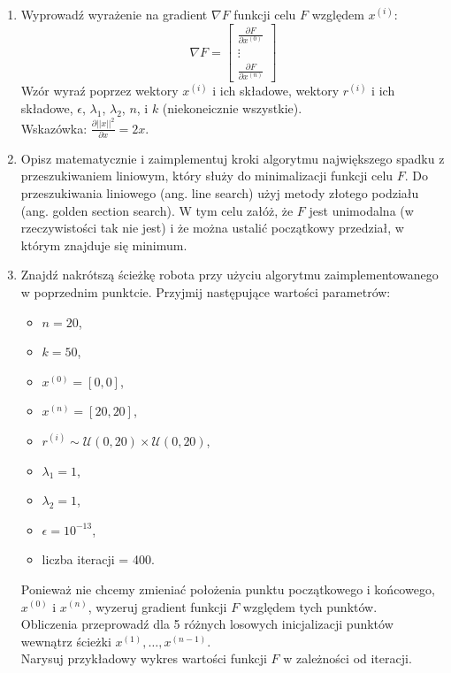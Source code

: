 \documentclass[11pt, leqno]{scrartcl}
\begin{document}
    \begin{enumerate}
        \item Wyprowadź wyrażenie na gradient $\nabla F$ funkcji
            celu $F$ względem $x^{(i)}$:
            \[
                \nabla F=
                \begin{bmatrix}
                    \frac{\partial F}{\partial x^{(0)}} \\
                    \vdots \\
                    \frac{\partial F}{\partial x^{(n)}}
                \end{bmatrix}
            \]
            Wzór wyraź poprzez wektory $x^{(i)}$ i ich składowe,
            wektory $r^{(i)}$ i ich składowe, $\epsilon$,
            $\lambda _1$, $\lambda _2$, $n$, i $k$ (niekoneicznie
            wszystkie). \\
            Wskazówka: $\frac{\partial ||x||^2}{\partial x}=2x$.
        \item Opisz matematycznie i zaimplementuj kroki algorytmu
            największego spadku z przeszukiwaniem liniowym, który
            służy do minimalizacji funkcji celu $F$. Do
            przeszukiwania liniowego (ang. line search) użyj metody
            złotego podziału (ang. golden section search). W tym
            celu załóż, że $F$ jest unimodalna (w rzeczywistości tak
            nie jest) i że można ustalić początkowy przedział,
            w którym znajduje się minimum.
        \item Znajdź nakrótszą ścieżkę robota przy użyciu algorytmu
            zaimplementowanego w poprzednim punktcie. Przyjmij
            następujące wartości parametrów:
            \begin{itemize}
                \item $n=20$,
                \item $k=50$,
                \item $x^{(0)}=[0,0]$,
                \item $x^{(n)}=[20,20]$,
                \item $r^{(i)}\sim \mathcal{U}(0,20)\times
                    \mathcal{U}(0,20)$,
                \item $\lambda _1=1$,
                \item $\lambda _2=1$,
                \item $\epsilon =10^{-13}$,
                \item liczba iteracji = 400.
            \end{itemize}
            Ponieważ nie chcemy zmieniać położenia punktu
            początkowego i końcowego, $x^{(0)}$ i $x^{(n)}$,
            wyzeruj gradient funkcji $F$ względem tych punktów. \\
            Obliczenia przeprowadź dla 5 różnych losowych
            inicjalizacji punktów wewnątrz ścieżki
            $x^{(1)},\ldots,x^{(n-1)}$. \\
            Narysuj przykładowy wykres wartości funkcji $F$
            w zależności od iteracji.
    \end{enumerate}
\end{document}
